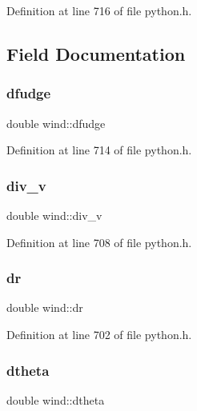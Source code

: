 Definition at line 716 of file python.\+h.



\subsection{Field Documentation}
\mbox{\label{structwind_a9e48704d3e2881e8cd2fef227c0ba8cd}} 
\subsubsection{\texorpdfstring{dfudge}{dfudge}}
{\footnotesize\ttfamily double wind\+::dfudge}



Definition at line 714 of file python.\+h.

\mbox{\label{structwind_a25a5b831a64c649f280da38e9b8821d9}} 
\subsubsection{\texorpdfstring{div\+\_\+v}{div\_v}}
{\footnotesize\ttfamily double wind\+::div\+\_\+v}



Definition at line 708 of file python.\+h.

\mbox{\label{structwind_aecd2315036110808fa470bffbf36e6a8}} 
\subsubsection{\texorpdfstring{dr}{dr}}
{\footnotesize\ttfamily double wind\+::dr}



Definition at line 702 of file python.\+h.

\mbox{\label{structwind_ab2fe12e1a8862dae8bf49dca7b44cee7}} 
\subsubsection{\texorpdfstring{dtheta}{dtheta}}
{\footnotesize\ttfamily double wind\+::dtheta}



